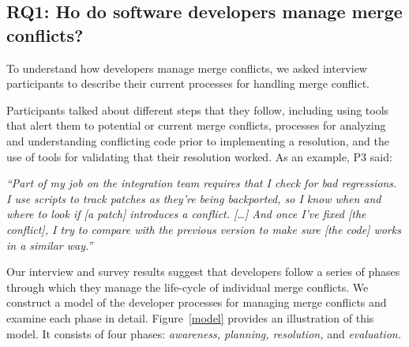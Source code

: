 
\subsection{\textbf{RQ1:} Ho do software developers manage merge conflicts?}\label{RQ1}

To understand how developers manage merge conflicts, we asked interview participants to describe their current processes for handling merge conflict.

Participants talked about different steps that they follow, including using tools that alert them to potential or current merge conflicts, processes for analyzing and understanding conflicting code prior to implementing a resolution, and the use of tools for validating that their resolution worked.
As an example, P3 said:
\begin{quoting}
\textit{``Part of my job on the integration team requires that I check for bad regressions. I use scripts to track patches as they're being backported, so I know when and where to look if [a patch] introduces a conflict. [\ldots] And once I've fixed [the conflict], I try to compare with the previous version to make sure [the code] works in a similar way.''}
\end{quoting}


Our interview and survey results suggest that developers follow a series of phases through which they manage the life-cycle of individual merge conflicts.
We construct a model of the developer processes for managing merge conflicts and examine each phase in detail.
Figure~\ref{model} provides an illustration of this model. 
It consists of four phases: \emph{awareness, planning, resolution,} and \emph{evaluation.}



